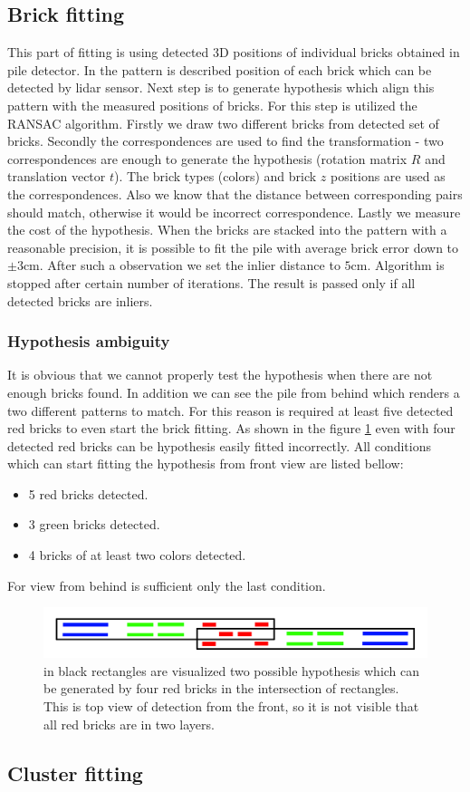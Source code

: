 \subsection{Brick fitting}
This part of fitting is using detected 3D positions of individual bricks obtained in pile detector. In the pattern is described position of each brick which can be detected by lidar sensor. Next step is to generate hypothesis which align this pattern with the measured positions of bricks. For this step is utilized the RANSAC algorithm. Firstly we draw two different bricks from detected set of bricks. Secondly the correspondences are used to find the transformation - two correspondences are enough to generate the hypothesis (rotation matrix $R$ and translation vector $t$). The brick types (colors) and brick $z$ positions are used as the correspondences. Also we know that the distance between corresponding pairs should match, otherwise it would be incorrect correspondence. Lastly we measure the cost of the hypothesis. When the bricks are stacked into the pattern with a reasonable precision, it is possible to fit the pile with average brick error down to $\pm 3$cm. After such a observation we set the inlier distance to $5$cm. Algorithm is stopped after certain number of iterations. The result is passed only if all detected bricks are inliers.

\subsubsection{Hypothesis ambiguity}
It is obvious that we cannot properly test the hypothesis when there are not enough bricks found. In addition we can see the pile from behind which renders a two different patterns to match. For this reason is required at least five detected red bricks to even start the brick fitting. As shown in the figure \ref{fig:ambiguity} even with four detected red bricks can be hypothesis easily fitted incorrectly. All conditions which can start fitting the hypothesis from front view are listed bellow:
\begin{itemize}
\item 5 red bricks detected.
\item 3 green bricks detected.
\item 4 bricks of at least two colors detected.
\end{itemize}
For view from behind is sufficient only the last condition.
\begin{figure}[H]
\centering
\includegraphics[scale=0.3]{fig/ambiguous.png}
\caption[Hypothesis ambiguity]{in black rectangles are visualized two possible hypothesis which can be generated by four red bricks in the intersection of rectangles. This is top view of detection from the front, so it is not visible that all red bricks are in two layers.}
\label{fig:ambiguity}
\end{figure}

\subsection{Cluster fitting}


